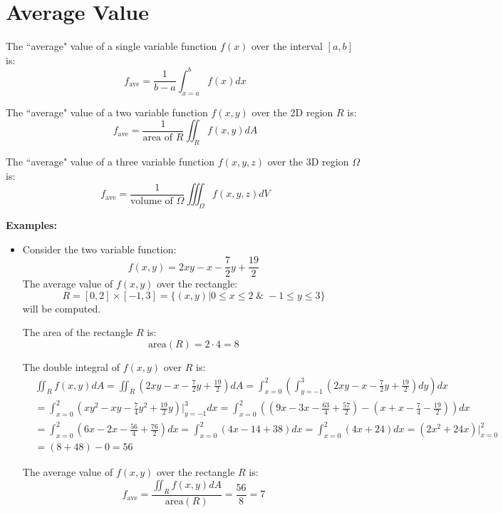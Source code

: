 \documentclass{article}
\begin{document}
\section*{Average Value}

The ``average" value of a single variable function \(f(x)\) over the interval \([a, b]\) is:
\[f_{\text{ave}} = \frac{1}{b-a}\int_{x=a}^b f(x)dx\]

The ``average" value of a two variable function \(f(x,y)\) over the 2D region \(R\) is:
\[f_{\text{ave}} = \frac{1}{\text{area of \(R\)}}\iint_R f(x,y)dA\]

The ``average" value of a three variable function \(f(x,y,z)\) over the 3D region \(\Omega\) is:
\[f_{\text{ave}} = \frac{1}{\text{volume of \(\Omega\)}}\iiint_{\Omega} f(x,y,z)dV\]

\textbf{Examples:}
\begin{itemize}
\item 
Consider the two variable function: 
\[f(x,y) = 2xy - x - \frac{7}{2}y + \frac{19}{2}\]
The average value of \(f(x,y)\) over the rectangle:
\[R = [0, 2] \times [-1, 3] = \{(x,y) | 0 \leq x \leq 2 \;\&\; -1 \leq y \leq 3\}\]
will be computed.

The area of the rectangle \(R\) is:
\[\text{area}(R) = 2 \cdot 4 = 8\]

The double integral of \(f(x,y)\) over \(R\) is:
\begin{align*}
& \iint_R f(x, y)dA  
= \iint_R \left(2xy - x - \frac{7}{2}y + \frac{19}{2}\right)dA 
= \int_{x = 0}^2 \left(\int_{y = -1}^3 \left(2xy - x - \frac{7}{2}y + \frac{19}{2}\right)dy\right)dx \\   
& = \int_{x = 0}^2 \left(xy^2 - xy - \frac{7}{4}y^2 + \frac{19}{2}y\right)\bigg|_{y = -1}^3 dx 
= \int_{x = 0}^2 \left(\left(9x - 3x - \frac{63}{4} + \frac{57}{2}\right) - \left(x + x - \frac{7}{4} - \frac{19}{2}\right)\right) dx \\  
& = \int_{x = 0}^2 \left(6x - 2x - \frac{56}{4} + \frac{76}{2}\right)dx 
= \int_{x = 0}^2 \left(4x - 14 + 38\right)dx 
= \int_{x = 0}^2 \left(4x + 24\right)dx  
= (2x^2 + 24x)\Big|_{x=0}^2 \\
& = (8 + 48) - 0 = 56
\end{align*}

The average value of \(f(x,y)\) over the rectangle \(R\) is:
\[f_{\text{ave}} = \frac{\iint_R f(x, y)dA}{\text{area}(R)} = \frac{56}{8} = 7\]
\end{itemize}
\end{document}

